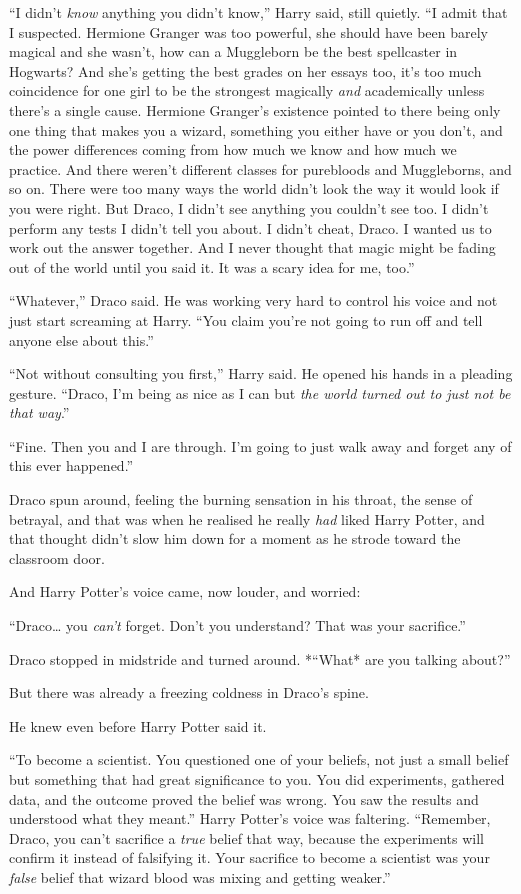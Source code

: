 ``I didn't \emph{know} anything you didn't know,'' Harry said, still
quietly. ``I admit that I suspected. Hermione Granger was too powerful,
she should have been barely magical and she wasn't, how can a Muggleborn
be the best spellcaster in Hogwarts? And she's getting the best grades
on her essays too, it's too much coincidence for one girl to be the
strongest magically \emph{and} academically unless there's a single
cause. Hermione Granger's existence pointed to there being only one
thing that makes you a wizard, something you either have or you don't,
and the power differences coming from how much we know and how much we
practice. And there weren't different classes for purebloods and
Muggleborns, and so on. There were too many ways the world didn't look
the way it would look if you were right. But Draco, I didn't see
anything you couldn't see too. I didn't perform any tests I didn't tell
you about. I didn't cheat, Draco. I wanted us to work out the answer
together. And I never thought that magic might be fading out of the
world until you said it. It was a scary idea for me, too.''

``Whatever,'' Draco said. He was working very hard to control his voice
and not just start screaming at Harry. ``You claim you're not going to
run off and tell anyone else about this.''

``Not without consulting you first,'' Harry said. He opened his hands in
a pleading gesture. ``Draco, I'm being as nice as I can but \emph{the
world turned out to just not be that way}.''

``Fine. Then you and I are through. I'm going to just walk away and
forget any of this ever happened.''

Draco spun around, feeling the burning sensation in his throat, the
sense of betrayal, and that was when he realised he really \emph{had}
liked Harry Potter, and that thought didn't slow him down for a moment
as he strode toward the classroom door.

And Harry Potter's voice came, now louder, and worried:

``Draco\ldots{} you \emph{can't} forget. Don't you understand? That was
your sacrifice.''

Draco stopped in midstride and turned around. *``What* are you talking
about?''

But there was already a freezing coldness in Draco's spine.

He knew even before Harry Potter said it.

``To become a scientist. You questioned one of your beliefs, not just a
small belief but something that had great significance to you. You did
experiments, gathered data, and the outcome proved the belief was wrong.
You saw the results and understood what they meant.'' Harry Potter's
voice was faltering. ``Remember, Draco, you can't sacrifice a
\emph{true} belief that way, because the experiments will confirm it
instead of falsifying it. Your sacrifice to become a scientist was your
\emph{false} belief that wizard blood was mixing and getting weaker.''

